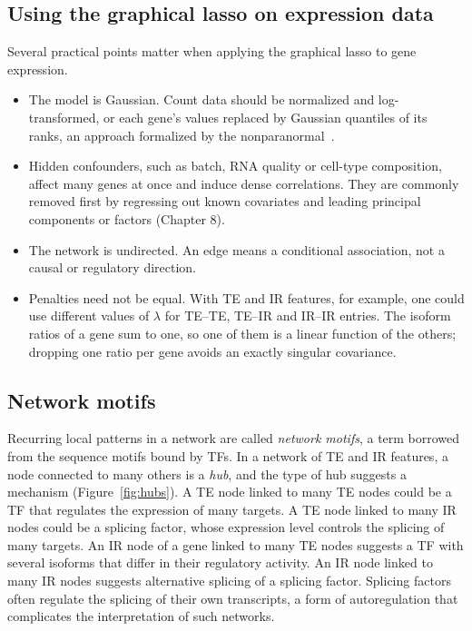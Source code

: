 \subsection{Using the graphical lasso on expression data}

Several practical points matter when applying the graphical lasso to gene expression.
\begin{itemize}
  \item The model is Gaussian. Count data should be normalized and log-transformed, or each gene's values replaced by Gaussian quantiles of its ranks, an approach formalized by the nonparanormal~\citep{liu2009}.
  \item Hidden confounders, such as batch, RNA quality or cell-type composition, affect many genes at once and induce dense correlations. They are commonly removed first by regressing out known covariates and leading principal components or factors (Chapter 8).
  \item The network is undirected. An edge means a conditional association, not a causal or regulatory direction.
  \item Penalties need not be equal. With TE and IR features, for example, one could use different values of $\lambda$ for TE--TE, TE--IR and IR--IR entries. The isoform ratios of a gene sum to one, so one of them is a linear function of the others; dropping one ratio per gene avoids an exactly singular covariance.
\end{itemize}

\subsection{Network motifs}

Recurring local patterns in a network are called \emph{network motifs}, a term borrowed from the sequence motifs bound by TFs. In a network of TE and IR features, a node connected to many others is a \emph{hub}, and the type of hub suggests a mechanism (Figure~\ref{fig:hubs}). A TE node linked to many TE nodes could be a TF that regulates the expression of many targets. A TE node linked to many IR nodes could be a splicing factor, whose expression level controls the splicing of many targets. An IR node of a gene linked to many TE nodes suggests a TF with several isoforms that differ in their regulatory activity. An IR node linked to many IR nodes suggests alternative splicing of a splicing factor. Splicing factors often regulate the splicing of their own transcripts, a form of autoregulation that complicates the interpretation of such networks.

